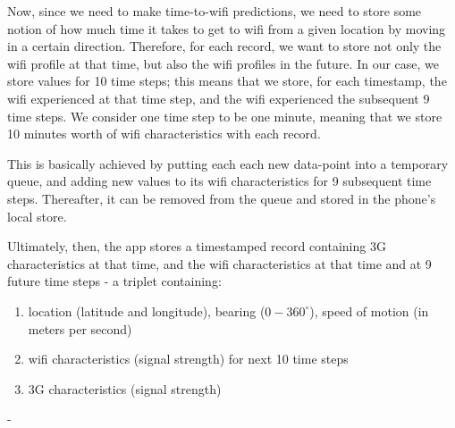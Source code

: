 \documentclass[12pt, fleqn]{article}
\begin{document}
Now, since we need to make time-to-wifi predictions, we need to store some 
notion of how much time it takes to get to wifi from a given location by moving 
in a certain direction. 
Therefore, for each record, we want to store not only the wifi profile at that time, but also 
the wifi profiles in the future. In our case, we store values for 10 time steps; 
this means that we store, for each timestamp, the 
wifi experienced at that time step, and the wifi experienced the subsequent 9
time steps. We consider one time step to be one minute, meaning that we store 10 
minutes worth of wifi characteristics with each record. 

This is basically achieved by putting each each new data-point into a temporary 
queue, and adding new values to its wifi characteristics for 9 subsequent time steps. 
Thereafter, it can be removed from the queue and stored in the phone's local store. 

Ultimately, then, the app stores a timestamped record containing 3G characteristics at 
that time, and the wifi characteristics at that time and at 9 future time steps - a triplet 
containing:
\begin{enumerate}
  \item location (latitude and longitude), bearing ($0-360^\circ$), speed of motion 
  (in meters per second)
  \item wifi characteristics (signal strength) for next 10 time steps 
  \item 3G characteristics (signal strength)
\end{enumerate}-
\end{document}
